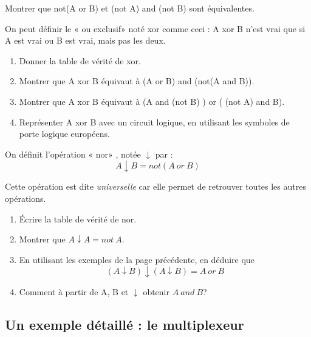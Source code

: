 \begin{exercice}[]
    Montrer que  not(A or B) et (not A) and (not B) sont équivalentes.\\
\end{exercice}

\begin{exercice}[]
    On peut définir le « ou exclusif»  noté xor comme ceci :  A xor B n'est vrai que si A est vrai ou B est vrai, mais pas les deux.
    \begin{enumerate}
        \item 	Donner la table de vérité de xor.
        \item 	Montrer que A xor B équivaut à (A or B) and (not(A and B)).
        \item 	Montrer que A xor B équivaut à (A and (not B) ) or ( (not A) and B).
        \item 	Représenter A xor B avec un circuit logique, en utilisant les symboles de porte logique européens.
    \end{enumerate}
\end{exercice}

\begin{exercice}[]
    On définit l'opération « nor» , notée $\downarrow$ par : $$A\downarrow B = not(A\ or\ B)$$

    Cette opération est dite \textit{universelle} car elle permet de retrouver toutes les autres opérations.

    \begin{enumerate}
        \item 	\'Ecrire la table de vérité de nor.
        \item 	Montrer que $A\downarrow A = not\ A$.
        \item 	En utilisant les exemples de la page précédente, en déduire que $$(A\downarrow B)\downarrow(A\downarrow B) = A\ or\ B$$
        \item 	Comment à partir de A, B et $\downarrow$ obtenir $A\ and\ B$?
    \end{enumerate}
\end{exercice}

\subsection{Un exemple détaillé : le multiplexeur}

